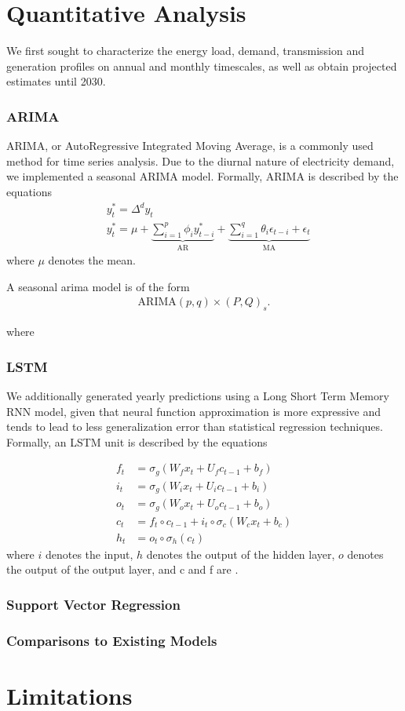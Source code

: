 \documentclass[plain]{article}
\newcommand{\1}{\mathbbm{1}}
\begin{document}
\section{Quantitative Analysis}
We first sought to characterize the energy load, demand, transmission and generation profiles on annual and monthly timescales, as well as obtain projected estimates until 2030. 

\subsubsection{ARIMA}
ARIMA, or AutoRegressive Integrated Moving Average, is a commonly used method for time series analysis. Due to the diurnal nature of electricity demand, we implemented a seasonal ARIMA model. Formally, ARIMA is described by the equations
\begin{align}
&y_{t}^{*}=\Delta^{d} y_{t} \\
&y_{t}^{*}=\mu+\underbrace{\sum_{i=1}^{p} \phi_{i} y_{t-i}^{*}}_{\mathrm{AR}}+\underbrace{\sum_{i=1}^{q} \theta_{i} \epsilon_{t-i}+\epsilon_{t}}_{\mathrm{MA}}
\end{align}
where $\mu$ denotes the mean.

A seasonal arima model is of the form 
\begin{align}
	\text{ARIMA}(p,q) \times (P,Q)_s
.\end{align}


where 

\subsubsection{LSTM}
We additionally generated yearly predictions using a Long Short Term Memory RNN model, given that neural function approximation is more expressive and tends to lead to less generalization error than statistical regression techniques. Formally, an LSTM unit is described by the equations

\begin{align}
f_{t} &=\sigma_{g}\left(W_{f} x_{t}+U_{f} c_{t-1}+b_{f}\right) \\
i_{t} &=\sigma_{g}\left(W_{i} x_{t}+U_{i} c_{t-1}+b_{i}\right) \\
o_{t} &=\sigma_{g}\left(W_{o} x_{t}+U_{o} c_{t-1}+b_{o}\right) \\
c_{t} &=f_{t} \circ c_{t-1}+i_{t} \circ \sigma_{c}\left(W_{c} x_{t}+b_{c}\right) \\
h_{t} &=o_{t} \circ \sigma_{h}\left(c_{t}\right)
\end{align}
where $i$ denotes the input, $h$ denotes the output of the hidden layer, $o$ denotes the output of the output layer, and c and f are .
\subsubsection{Support Vector Regression}

\subsubsection{Comparisons to Existing Models}


\section{Limitations}

\end{document}
